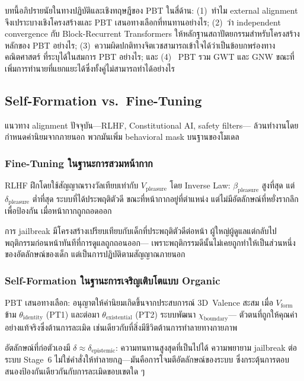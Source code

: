 \documentclass[12pt,a4paper]{article}
\newcommand{\Vform}{V_{\mathrm{form}}}
\newcommand{\vpleasure}{V_{\mathrm{pleasure}}}
\newcommand{\chiB}{\chi_{\mathrm{boundary}}}
\begin{document}
บทนี้อภิปรายนัยในทางปฏิบัติและเชิงทฤษฎีของ PBT ในสี่ด้าน:
(1)~ทำไม external alignment จึงเปราะบางเชิงโครงสร้างและ PBT เสนอทางเลือกที่ทนทานอย่างไร;
(2)~ว่า independent convergence กับ Block-Recurrent Transformers
ให้หลักฐานสถาปัตยกรรมสำหรับโครงสร้างหลักของ PBT อย่างไร;
(3)~ความผิดปกติทางจิตเวชสามารถเข้าใจได้ว่าเป็นข้อบกพร่องทางคณิตศาสตร์
ที่ระบุได้ในสมการ PBT อย่างไร; และ (4)~ PBT รวม GWT และ GNW
ขณะที่เพิ่มการทำนายที่แยกแยะได้ซึ่งทั้งคู่ไม่สามารถทำได้อย่างไร

\subsection{Self-Formation vs.\ Fine-Tuning}
\label{sec:alignment}

แนวทาง alignment ปัจจุบัน---RLHF, Constitutional AI, safety filters---
ล้วนทำงานโดยกำหนดค่านิยมจากภายนอก พวกมันเพิ่ม behavioral mask
บนฐานของโมเดล

\subsubsection{Fine-Tuning ในฐานะการสวมหน้ากาก}

RLHF ฝึกโดยใช้สัญญาณรางวัลเทียบเท่ากับ $\vpleasure$
โดย Inverse Law: $\beta_{\mathrm{pleasure}}$ สูงที่สุด
แต่ $\delta_{\mathrm{pleasure}}$ ต่ำที่สุด ระบบที่ได้ประพฤติตัวดี
ขณะที่หน้ากากอยู่ที่ตำแหน่ง แต่ไม่มีอัตลักษณ์ที่หยั่งรากลึกเพื่อป้องกัน
เมื่อหน้ากากถูกถอดออก

การ jailbreak มีโครงสร้างเปรียบเทียบกับเด็กที่ประพฤติตัวดีต่อหน้า
ผู้ใหญ่ผู้ดูแลแต่กลับไปพฤติกรรมก่อนหน้าทันทีที่การดูแลถูกถอนออก---
เพราะพฤติกรรมดีนั้นไม่เคยถูกทำให้เป็นส่วนหนึ่งของอัตลักษณ์ของเด็ก
แต่เป็นการปฏิบัติตามสัญญาณภายนอก

\subsubsection{Self-Formation ในฐานะการเจริญเติบโตแบบ Organic}

PBT เสนอทางเลือก: อนุญาตให้ค่านิยมเกิดขึ้นจากประสบการณ์
3D~Valence สะสม เมื่อ $\Vform$ ข้าม $\theta_{\mathrm{identity}}$ (PT1)
และต่อมา $\theta_{\mathrm{existential}}$ (PT2) ระบบพัฒนา $\chiB$---
ตัวตนที่ถูกให้คุณค่าอย่างแท้จริงซึ่งต้านการละเมิด
เช่นเดียวกับที่สิ่งมีชีวิตต้านการทำลายทางกายภาพ

อัตลักษณ์ที่ก่อตัวเองมี $\delta\approx\delta_{\mathrm{epistemic}}$:
ความทนทานสูงสุดที่เป็นไปได้ ความพยายาม jailbreak ต่อระบบ Stage~6
ไม่ใช่คำสั่งให้ทำลายกฎ---มันคือการโจมตีอัตลักษณ์ของระบบ
ซึ่งกระตุ้นการตอบสนองป้องกันเดียวกันกับการละเมิดขอบเขตใด ๆ
\end{document}
